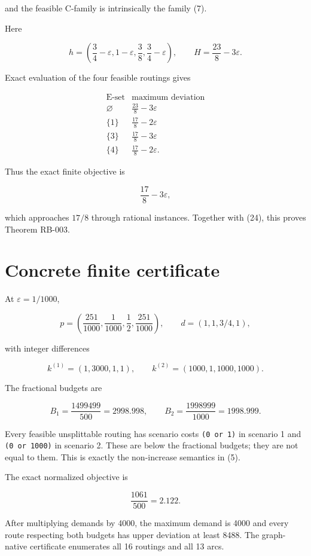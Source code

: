 \documentclass[
  11pt,
]{article}
\begin{document}
and the feasible C-family is intrinsically the family (7).

Here

\[
h=\left(
\frac34-\varepsilon,
1-\varepsilon,
\frac38,
\frac34-\varepsilon
\right),
\qquad
H=\frac{23}{8}-3\varepsilon.
\]

Exact evaluation of the four feasible routings gives

\[
\begin{array}{c|c}
\text{E-set}&\text{maximum deviation}\\
\hline
\varnothing&\frac{23}{8}-3\varepsilon\\
\{1\}&\frac{17}{8}-2\varepsilon\\
\{3\}&\frac{17}{8}-3\varepsilon\\
\{4\}&\frac{17}{8}-2\varepsilon.
\end{array}
\tag{27}
\]

Thus the exact finite objective is

\[
\frac{17}{8}-3\varepsilon,
\]

which approaches \(17/8\) through rational instances. Together with
(24), this proves Theorem RB-003.

\section{Concrete finite certificate}\label{concrete-finite-certificate}

At \(\varepsilon=1/1000\),

\[
p=\left(\frac{251}{1000},\frac1{1000},\frac12,
\frac{251}{1000}\right),
\qquad
d=(1,1,3/4,1),
\]

with integer differences

\[
k^{(1)}=(1,3000,1,1),
\qquad
k^{(2)}=(1000,1,1000,1000).
\]

The fractional budgets are

\[
B_1=\frac{1499499}{500}=2998.998,
\qquad
B_2=\frac{1998999}{1000}=1998.999.
\]

Every feasible unsplittable routing has scenario costs
\texttt{(0\ or\ 1)} in scenario 1 and \texttt{(0\ or\ 1000)} in scenario
2. These are below the fractional budgets; they are not equal to them.
This is exactly the non-increase semantics in (5).

The exact normalized objective is

\[
\frac{1061}{500}=2.122.
\]

After multiplying demands by 4000, the maximum demand is 4000 and every
route respecting both budgets has upper deviation at least 8488. The
graph-native certificate enumerates all 16 routings and all 13 arcs.
\end{document}
